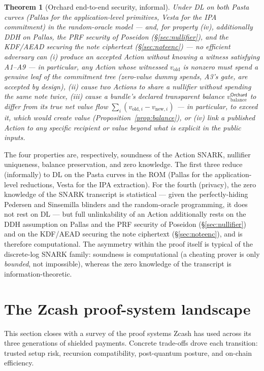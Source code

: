 \documentclass[11pt,a4paper]{article}
\newtheorem{theorem}{Theorem}[section]
\theoremstyle{definition}
\begin{document}
\begin{theorem}[Orchard end-to-end security, informal]\label{thm:orchard-e2e}
Under DL on both Pasta curves (Pallas for the application-level
primitives, Vesta for the IPA commitment) in the random-oracle model ---
and, for property (iv), additionally DDH on Pallas, the PRF security of
Poseidon (\S\ref{sec:nullifier}), and the KDF/AEAD securing the note
ciphertext (\S\ref{sec:noteenc}) --- no efficient adversary
can (i) produce an accepted Action without knowing a witness satisfying
A1--A9 --- in particular, any Action whose witnessed $v_{\mathrm{old}}$ is
nonzero must spend a genuine leaf of the commitment tree (zero-value dummy
spends, A3's gate, are accepted by design), (ii) cause two Actions to share
a nullifier without spending the same note twice, (iii) cause a bundle's
declared transparent balance $v_{\mathrm{balance}}^{\mathsf{Orchard}}$ to
differ from its true net value flow
$\sum_i (v_{\mathrm{old},i} - v_{\mathrm{new},i})$ --- in particular, to
exceed it, which would create value (Proposition~\ref{prop:balance}), or
(iv) link a published Action to any specific recipient or value beyond
what is explicit in the public inputs.
\end{theorem}

The four properties are, respectively, soundness of the Action SNARK,
nullifier uniqueness, balance preservation, and zero knowledge. The first
three reduce (informally) to DL on the Pasta curves in the ROM (Pallas
for the application-level reductions, Vesta for the IPA extraction). For
the fourth (privacy), the zero knowledge of the SNARK transcript is
statistical --- given the perfectly-hiding Pedersen and Sinsemilla
blinders and the random-oracle programming, it does not rest on DL ---
but full unlinkability of an Action additionally rests on the DDH
assumption on Pallas and the PRF security of Poseidon
(\S\ref{sec:nullifier}) and on the KDF/AEAD securing the note ciphertext
(\S\ref{sec:noteenc}), and is therefore computational. The asymmetry
within the proof itself is typical of the discrete-log SNARK family:
soundness is computational (a cheating prover is only \emph{bounded},
not impossible), whereas the zero knowledge of the transcript is
information-theoretic.

\section{The Zcash proof-system landscape}\label{sec:zcash}

This section closes with a survey of the proof systems Zcash has used across its
three generations of shielded payments. Concrete trade-offs drove each transition:
trusted setup risk, recursion compatibility, post-quantum
posture, and on-chain efficiency.
\end{document}
